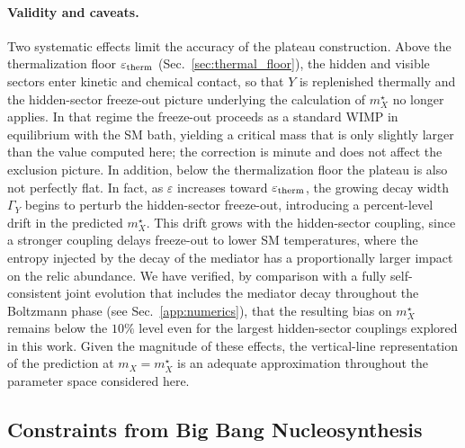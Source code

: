 \documentclass[11pt]{article}
\numberwithin{equation}{section}
\begin{document}
\paragraph{Validity and caveats.}
Two systematic effects limit the accuracy of the plateau construction. Above the thermalization floor $\varepsilon_{\rm therm}$ (Sec.~\ref{sec:thermal_floor}), the hidden and visible sectors enter kinetic and chemical contact, so that $Y$ is replenished thermally and the hidden-sector freeze-out picture underlying the calculation of $m_X^\star$ no longer applies. In that regime the freeze-out proceeds as a standard WIMP in equilibrium with the SM bath, yielding a critical mass that is only slightly larger than the value computed here; the correction is minute and does not affect the exclusion picture. In addition, below the thermalization floor the plateau is also not perfectly flat. In fact, as $\varepsilon$ increases toward $\varepsilon_{\rm therm}$, the growing decay width $\Gamma_Y$ begins to perturb the hidden-sector freeze-out, introducing a percent-level drift in the predicted $m_X^\star$. This drift grows with the hidden-sector coupling, since a stronger coupling delays freeze-out to lower SM temperatures, where the entropy injected by the decay of the mediator has a proportionally larger impact on the relic abundance. We have verified, by comparison with a fully self-consistent joint evolution that includes the mediator decay throughout the Boltzmann phase (see Sec.~\ref{app:numerics}), that the resulting bias on $m_X^\star$ remains below the $10\%$ level even for the largest hidden-sector couplings explored in this work. Given the magnitude of these effects, the vertical-line representation of the prediction at $m_X = m_X^\star$ is an adequate approximation throughout the parameter space considered here.

\subsection{Constraints from Big Bang Nucleosynthesis}
\label{sec:bbn}
\end{document}
